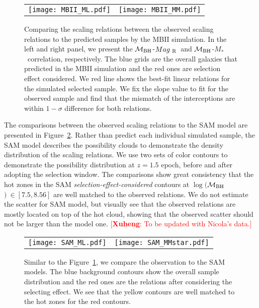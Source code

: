 \documentclass{natureprintstyle}
\newcommand{\mbh}{$\mathcal M_{\rm BH}$}
\newcommand{\mr}{$Mag_{\rm ~R}$}
\newcommand{\mstar}{{$M_*$}}
\newcommand{\ding}[1]{\textcolor{red}{[{\bf Xuheng}: #1]}}
\begin{document}
\begin{figure*}[t]%
\begin{tabular}{c c}
\texttt{[image: MBII\_ML.pdf]} &
\texttt{[image: MBII\_MM.pdf]} \\
\end{tabular}
\caption{
Comparing the scaling relations between the observed scaling relations to the predicted samples by the MBII simulation. In the left and right panel, we present the \mbh-\mr\ and \mbh-\mstar\ correlation, respectively. The blue grids are the overall galaxies that predicted in the MBII simulation and the red ones are selection effect considered. We red line shows the best-fit linear relations for the simulated selected sample. We fix the slope value to fit for the observed sample and find that the mismatch of the interceptions are within $1-\sigma$ difference for both relations. %
}
\label{fig:MBII_comp}
\end{figure*}

The comparisons between the observed scaling relations to the SAM model are presented in Figure~\ref{fig:SAM_comp}. Rather than predict each individual simulated sample, the SAM model describes the possibility clouds to demonstrate the density distribution of the scaling relations. We use two sets of color contours to demonstrate the possibility distribution at $z=1.5$ epoch, before and after adopting the selection window. The comparisons show great consistency that the hot zones in the SAM {\it selection-effect-considered} contours at $\log($\mbh$)~\in[7.5, 8.56]$ are well matched to the observed relations. We do not estimate the scatter for SAM model, but visually see that the observed relations are mostly located on top of the hot cloud, showing that the observed scatter should not be larger than the model one. \ding{To be updated with Nicola's data.}

\begin{figure*}[t]%
\begin{tabular}{c c}
\texttt{[image: SAM\_ML.pdf]} &
\texttt{[image: SAM\_MMstar.pdf]} \\
\end{tabular}
\caption{ Similar to the Figure~\ref{fig:MBII_comp}, we compare the observation to the SAM models. The blue background contours show the overall sample distribution and the red ones are the relations after considering the selecting effect. We see that the yellow contours are well matched to the hot zones for the red contours.
}
\label{fig:SAM_comp}
\end{figure*}
\end{document}
